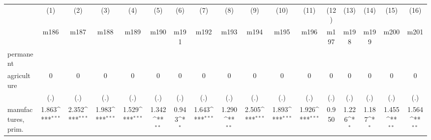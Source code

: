 {
\def\sym#1{\ifmmode^{#1}\else\(^{#1}\)\fi}
\begin{tabular}{l*{16}{c}}
\hline\hline
                    &\multicolumn{1}{c}{(1)}&\multicolumn{1}{c}{(2)}&\multicolumn{1}{c}{(3)}&\multicolumn{1}{c}{(4)}&\multicolumn{1}{c}{(5)}&\multicolumn{1}{c}{(6)}&\multicolumn{1}{c}{(7)}&\multicolumn{1}{c}{(8)}&\multicolumn{1}{c}{(9)}&\multicolumn{1}{c}{(10)}&\multicolumn{1}{c}{(11)}&\multicolumn{1}{c}{(12)}&\multicolumn{1}{c}{(13)}&\multicolumn{1}{c}{(14)}&\multicolumn{1}{c}{(15)}&\multicolumn{1}{c}{(16)}\\
                    &\multicolumn{1}{c}{m186}&\multicolumn{1}{c}{m187}&\multicolumn{1}{c}{m188}&\multicolumn{1}{c}{m189}&\multicolumn{1}{c}{m190}&\multicolumn{1}{c}{m191}&\multicolumn{1}{c}{m192}&\multicolumn{1}{c}{m193}&\multicolumn{1}{c}{m194}&\multicolumn{1}{c}{m195}&\multicolumn{1}{c}{m196}&\multicolumn{1}{c}{m197}&\multicolumn{1}{c}{m198}&\multicolumn{1}{c}{m199}&\multicolumn{1}{c}{m200}&\multicolumn{1}{c}{m201}\\
\hline
permanent           &                     &                     &                     &                     &                     &                     &                     &                     &                     &                     &                     &                     &                     &                     &                     &                     \\
agriculture         &           0         &           0         &           0         &           0         &           0         &           0         &           0         &           0         &           0         &           0         &           0         &           0         &           0         &           0         &           0         &           0         \\
                    &         (.)         &         (.)         &         (.)         &         (.)         &         (.)         &         (.)         &         (.)         &         (.)         &         (.)         &         (.)         &         (.)         &         (.)         &         (.)         &         (.)         &         (.)         &         (.)         \\
[1em]
manufactures, prim. &       1.863\sym{***}&       2.352\sym{***}&       1.983\sym{***}&       1.529\sym{***}&       1.342\sym{**} &       0.943\sym{*}  &       1.643\sym{***}&       1.290\sym{**} &       2.505\sym{***}&       1.893\sym{***}&       1.926\sym{***}&       0.950         &       1.226\sym{*}  &       1.187\sym{*}  &       1.455\sym{**} &       1.564\sym{**} \\

\end{tabular}}

